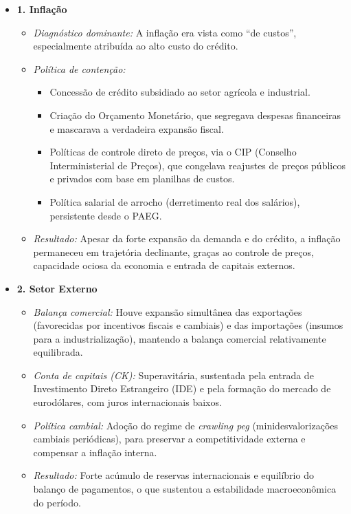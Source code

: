 \documentclass[a4paper,12pt]{article}[abntex2]
\begin{document}
\begin{itemize}
    \item \textbf{1. Inflação}
    \begin{itemize}
        \item \textit{Diagnóstico dominante:} A inflação era vista como “de custos”, especialmente atribuída ao alto custo do crédito.
        \item \textit{Política de contenção:}
        \begin{itemize}
            \item Concessão de crédito subsidiado ao setor agrícola e industrial.
            \item Criação do Orçamento Monetário, que segregava despesas financeiras e mascarava a verdadeira expansão fiscal.
            \item Políticas de controle direto de preços, via o CIP (Conselho Interministerial de Preços), que congelava reajustes de preços públicos e privados com base em planilhas de custos.
            \item Política salarial de arrocho (derretimento real dos salários), persistente desde o PAEG.
        \end{itemize}
        \item \textit{Resultado:} Apesar da forte expansão da demanda e do crédito, a inflação permaneceu em trajetória declinante, graças ao controle de preços, capacidade ociosa da economia e entrada de capitais externos.
    \end{itemize}

    \item \textbf{2. Setor Externo}
    \begin{itemize}
        \item \textit{Balança comercial:} Houve expansão simultânea das exportações (favorecidas por incentivos fiscais e cambiais) e das importações (insumos para a industrialização), mantendo a balança comercial relativamente equilibrada.
        \item \textit{Conta de capitais (CK):} Superavitária, sustentada pela entrada de Investimento Direto Estrangeiro (IDE) e pela formação do mercado de eurodólares, com juros internacionais baixos.
        \item \textit{Política cambial:} Adoção do regime de \textit{crawling peg} (minidesvalorizações cambiais periódicas), para preservar a competitividade externa e compensar a inflação interna.
        \item \textit{Resultado:} Forte acúmulo de reservas internacionais e equilíbrio do balanço de pagamentos, o que sustentou a estabilidade macroeconômica do período.
    \end{itemize}


\end{itemize}
\end{document}
